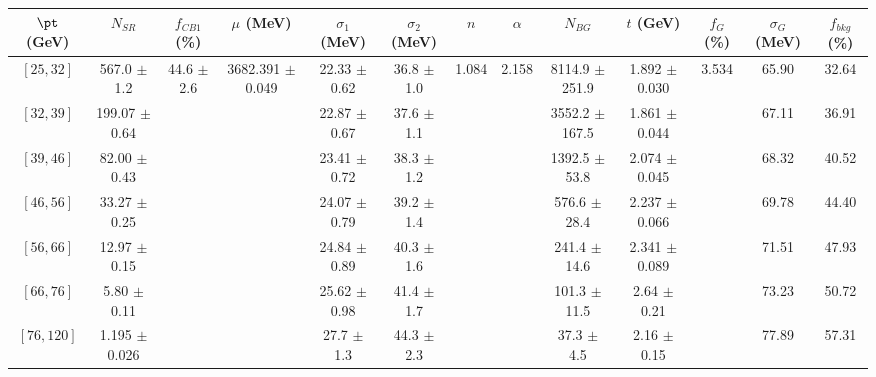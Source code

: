 \begin{tabular}{c||c|c|c|c|c|c|c|c|c|c|c||c}
$\pt$ (GeV) & $N_{SR}$ & $f_{CB1}$ (\%) & $\mu$ (MeV) & $\sigma_1$ (MeV) & $\sigma_2$ (MeV) & $n$ & $\alpha$ & $N_{BG}$ & $t$ (GeV) & $f_G$ (\%) & $\sigma_G$ (MeV) & $f_{bkg}$ (\%) \\
\hline
$[25, 32]$ & 567.0 $\pm$ 1.2 & \multirow{7}{*}{44.6 $\pm$ 2.6} & \multirow{7}{*}{3682.391 $\pm$ 0.049} & 22.33 $\pm$ 0.62 & 36.8 $\pm$ 1.0 & \multirow{7}{*}{1.084} & \multirow{7}{*}{2.158} & 8114.9 $\pm$ 251.9 & 1.892 $\pm$ 0.030 & \multirow{7}{*}{3.534} & 65.90 & 32.64\\
$[32, 39]$ & 199.07 $\pm$ 0.64 &  &  & 22.87 $\pm$ 0.67 & 37.6 $\pm$ 1.1 &  &  & 3552.2 $\pm$ 167.5 & 1.861 $\pm$ 0.044 &  & 67.11 & 36.91\\
$[39, 46]$ & 82.00 $\pm$ 0.43 &  &  & 23.41 $\pm$ 0.72 & 38.3 $\pm$ 1.2 &  &  & 1392.5 $\pm$ 53.8 & 2.074 $\pm$ 0.045 &  & 68.32 & 40.52\\
$[46, 56]$ & 33.27 $\pm$ 0.25 &  &  & 24.07 $\pm$ 0.79 & 39.2 $\pm$ 1.4 &  &  & 576.6 $\pm$ 28.4 & 2.237 $\pm$ 0.066 &  & 69.78 & 44.40\\
$[56, 66]$ & 12.97 $\pm$ 0.15 &  &  & 24.84 $\pm$ 0.89 & 40.3 $\pm$ 1.6 &  &  & 241.4 $\pm$ 14.6 & 2.341 $\pm$ 0.089 &  & 71.51 & 47.93\\
$[66, 76]$ & 5.80 $\pm$ 0.11 &  &  & 25.62 $\pm$ 0.98 & 41.4 $\pm$ 1.7 &  &  & 101.3 $\pm$ 11.5 & 2.64 $\pm$ 0.21 &  & 73.23 & 50.72\\
$[76, 120]$ & 1.195 $\pm$ 0.026 &  &  & 27.7 $\pm$ 1.3 & 44.3 $\pm$ 2.3 &  &  & 37.3 $\pm$ 4.5 & 2.16 $\pm$ 0.15 &  & 77.89 & 57.31\\
\end{tabular}
